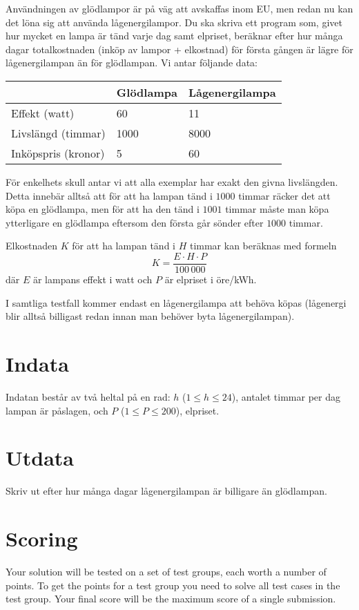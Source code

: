 Användningen av glödlampor är på väg att avskaffas inom EU, men redan nu kan det löna sig att använda lågenergilampor.
Du ska skriva ett program som, givet hur mycket en lampa är tänd varje dag samt elpriset, beräknar efter hur många dagar totalkostnaden (inköp av lampor + elkostnad) för första gången är lägre för lågenergilampan än för glödlampan.
Vi antar följande data:

\noindent
\begin{tabular}{|l|l|l|}
\hline
& Glödlampa & Lågenergilampa \\ \hline
Effekt (watt)           & 60                & 11             \\ \hline
Livslängd (timmar)           & 1000              & 8000           \\ \hline
Inköpspris (kronor) & 5                 & 60             \\ \hline
\end{tabular}

För enkelhets skull antar vi att alla exemplar har exakt den givna livslängden.
Detta innebär alltså att för att ha lampan tänd i $1000$ timmar räcker det att köpa en glödlampa, men för att ha den tänd i $1001$ timmar måste man köpa ytterligare en glödlampa eftersom den första går sönder efter $1000$ timmar.

Elkostnaden $K$ för att ha lampan tänd i $H$ timmar kan beräknas med formeln
$$ K = \frac{E \cdot H \cdot P}{100\,000} $$
där $E$ är lampans effekt i watt och $P$ är elpriset i öre/kWh.

I samtliga testfall kommer endast en lågenergilampa att behöva köpas (lågenergi blir alltså billigast redan innan man behöver byta lågenergilampan).

\section*{Indata}
Indatan består av två heltal på en rad: $h$ ($1 \le h \le 24$), antalet timmar per dag lampan är påslagen, och $P$ ($1 \le P \le 200$), elpriset.

\section*{Utdata}
Skriv ut efter hur många dagar lågenergilampan är billigare än glödlampan.

\section*{Scoring}
Your solution will be tested on a set of test groups, each worth a number of points.
To get the points for a test group you need to solve all test cases in the test group. Your final score will be the maximum score of a single submission.

